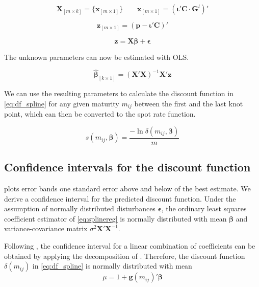\begin{equation*}
\bm{X}_{\left[m \times k\right]}=\{ \bm{x}_{\left[m \times 1\right]} \} \qquad  \bm{x}_{\left[m \times 1\right]} = \left( \bm{\iota}'\bm{C}\cdot\bm{G}^l\right)'
\end{equation*}


\begin{equation*}
\bm{z}_{\left[m \times 1\right]}= \left(\bm{p}-\bm{\iota}'\bm{C}\right)'
\end{equation*}
       

\begin{equation}
\label{eq:splinereg}
    \bm{z}=\bm{X}\bm{\beta}+\bm{\epsilon}
\end{equation}
          
The unknown parameters can now be estimated with OLS.
	
\begin{equation*}
\label{eq:paramspline}
\bm{\hat \beta}_{\left[k\times 1\right]}= \left( \bm{X}' \bm{X}\right )^{-1}\bm{X}' \bm{z}
\end{equation*}

We can use the resulting parameters to calculate the discount function in \eqref{eq:df_spline} for any given maturity $m_{ij}$ between the first and the last knot point, which can then be converted to the spot rate function.

\begin{equation*}
  \label{eq:transformdf}
  s(m_{ij},\bm{\beta}) = \frac{-\ln \delta(m_{ij},\bm{\beta})}{m}
\end{equation*}


\subsection{Confidence intervals for the discount function}

\cite{McCulloch1975} plots error bands one standard error above and below of the best estimate. We derive a confidence interval for the predicted discount function. Under the assumption of normally distributed disturbances $\bm{\epsilon}$, the ordinary least squares coefficient estimator of \eqref{eq:splinereg} is normally distributed with mean $\bm{\beta}$ and variance-covariance matrix $\sigma^2\bm{X}'\bm{X}^{-1}$. 

Following \cite{Greene2002}, the confidence interval for a linear combination of coefficients can be obtained by applying the decomposition of \cite{Oaxaca1973}. Therefore, the discount function $\delta(m_{ij})$ in \eqref{eq:df_spline} is normally 
distributed with mean
\begin{equation*}
\mu = 1+\bm{g}(m_{ij})'\bm{\beta}
\end{equation*}

